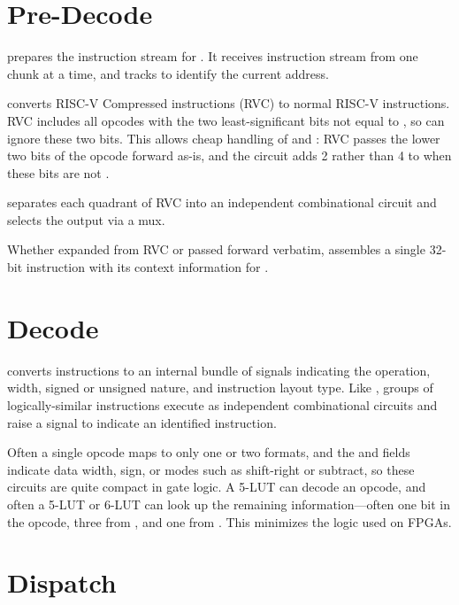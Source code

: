 \section{Pre-Decode}

 prepares the instruction stream for
.  It receives instruction stream from 
one chunk at a time, and tracks  to identify the current
address.

 converts RISC-V Compressed instructions (RVC) to normal
RISC-V instructions.  RVC includes all opcodes with the two least-significant
bits not equal to , so  can ignore these two
bits.  This allows cheap handling of  and
:  RVC passes the lower two bits of the opcode forward
as-is, and the  circuit adds 2 rather than 4 to
 when these bits are not .

 separates each quadrant of RVC into an independent
combinational circuit and selects the output via a mux.

Whether expanded from RVC or passed forward verbatim, 
assembles a single 32-bit instruction with its context information for
.

\section{Decode}

 converts instructions to an internal bundle of signals
indicating the operation, width, signed or unsigned nature, and instruction
layout type.  Like , groups of logically-similar
instructions execute as independent combinational circuits and raise a signal
to indicate an identified instruction.

Often a single opcode maps to only one or two formats, and the
 and  fields indicate data width, sign,
or modes such as shift-right or subtract, so these circuits are quite compact
in gate logic.  A 5-LUT can decode an opcode, and often a 5-LUT or 6-LUT can
look up the remaining information—often one bit in the opcode, three from
, and one from .  This minimizes the
logic used on FPGAs.

\section{Dispatch}

